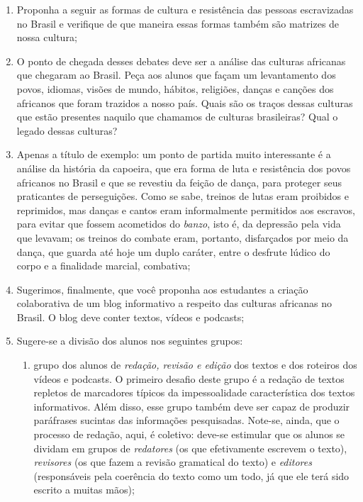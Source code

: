 \documentclass[11pt]{extarticle}
\begin{document}
\begin{enumerate}
\item Proponha a seguir as formas de cultura e resistência das pessoas
escravizadas no Brasil e verifique de que maneira essas formas também
são matrizes de nossa cultura;

\item O ponto de chegada desses debates deve ser a análise das culturas
africanas que chegaram ao Brasil. Peça aos alunos que façam um
levantamento dos povos, idiomas, visões de mundo, hábitos, religiões,
danças e canções dos africanos que foram trazidos a nosso país. Quais
são os traços dessas culturas que estão presentes naquilo que chamamos
de culturas brasileiras? Qual o legado dessas culturas?

\item Apenas a título de exemplo: um ponto de partida muito interessante é
a análise da história da capoeira, que era forma de luta e resistência
dos povos africanos no Brasil e que se revestiu da feição de dança, para
proteger seus praticantes de perseguições. Como se sabe, treinos de
lutas eram proibidos e reprimidos, mas danças e cantos eram
informalmente permitidos aos escravos, para evitar que fossem acometidos
do \emph{banzo}, isto é, da depressão pela vida que levavam; os treinos
do combate eram, portanto, disfarçados por meio da dança, que guarda até
hoje um duplo caráter, entre o desfrute lúdico do corpo e a finalidade
marcial, combativa;

\item Sugerimos, finalmente, que você proponha aos estudantes a criação
colaborativa de um blog informativo a respeito das culturas africanas no
Brasil. O blog deve conter textos, vídeos e podcasts;

\item Sugere-se a divisão dos alunos nos seguintes grupos:

\begin{enumerate}
\item grupo dos alunos de \emph{redação, revisão e edição} dos textos e dos
roteiros dos vídeos e podcasts. O primeiro desafio deste grupo é a
redação de textos repletos de marcadores típicos da impessoalidade
característica dos textos informativos. Além disso, esse grupo também
deve ser capaz de produzir paráfrases sucintas das informações
pesquisadas. Note-se, ainda, que o processo de redação, aqui, é
coletivo: deve-se estimular que os alunos se dividam em grupos de
\emph{redatores} (os que efetivamente escrevem o texto),
\emph{revisores} (os que fazem a revisão gramatical do texto) e
\emph{editores} (responsáveis pela coerência do texto como um todo, já
que ele terá sido escrito a muitas mãos);


\end{enumerate}
\end{enumerate}
\end{document}
